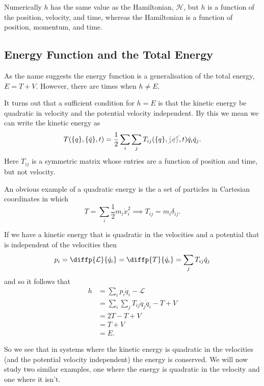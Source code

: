 \documentclass[fleqn]{NotesClass}
\newcommand*{\nodependence}[1]{\textcolor{gray}{\cancel{#1}}}
\newcommand*{\lagrangian}{\mathcal{L}}
\newcommand*{\hamiltonian}{\mathcal{H}}
\begin{document}
    Numerically \(h\) has the same value as the Hamiltonian, \(\hamiltonian\), but \(h\) is a function of the position, velocity, and time, whereas the Hamiltonian is a function of position, momentum, and time.
    
    \subsection{Energy Function and the Total Energy}
    As the name suggests the energy function is a generalisation of the total energy, \(E = T + V\).
    However, there are times when \(h \ne E\).
    
    It turns out that a sufficient condition for \(h = E\) is that the kinetic energy be quadratic in velocity and the potential velocity independent.
    By this we mean we can write the kinetic energy as
    \begin{equation}
        T(\{q\}, \{\dot{q}\}, t) = \frac{1}{2}\sum_i\sum_j T_{ij}(\{q\}, \nodependence{\{\dot{q}\}}, t) \dot{q}_i\dot{q}_j.
    \end{equation}
    Here \(T_{ij}\) is a symmetric matrix whose entries are a function of position and time, but not velocity.
    
    An obvious example of a quadratic energy is the a set of particles in Cartesian coordinates in which
    \begin{equation}
        T = \sum_{i}\frac{1}{2}m_i\dot{x}_i^2 \implies T_{ij} = m_i\delta_{ij}.
    \end{equation}
    
    If we have a kinetic energy that is quadratic in the velocities and a potential that is independent of the velocities then
    \begin{equation}
        p_i = \diffp{\lagrangian}{\dot{q}_i} = \diffp{T}{\dot{q}_i} = \sum_j T_{ij}\dot{q}_j
    \end{equation}
    and so it follows that
    \begin{align}
        h &= \sum_i p_i\dot{q}_i - \lagrangian\\
        &= \sum_i \sum_j T_{ij}\dot{q}_j\dot{q}_i - T + V\\
        &= 2T - T + V\\
        &= T + V\\
        &= E.
    \end{align}
    
    So we see that in systems where the kinetic energy is quadratic in the velocities (and the potential velocity independent) the energy is conserved.
    We will now study two similar examples, one where the energy is quadratic in the velocity and one where it isn't.
    
\end{document}
